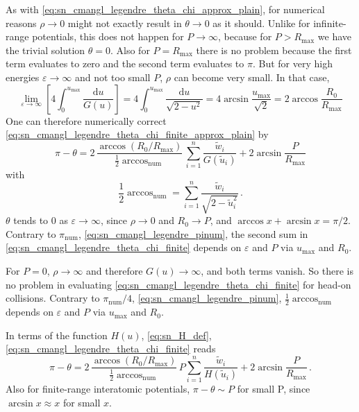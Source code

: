As with \cref{eq:sn_cmangl_legendre_theta_chi_approx_plain}, for numerical reasons $\rho \rightarrow 0$ might not exactly result in $\theta \rightarrow 0$ as it should.
Unlike for infinite-range potentials, this does not happen for $P \rightarrow \infty$, because for $P > R_\mathrm{max}$ we have the trivial solution $\theta = 0$.
Also for $P = R_\mathrm{max}$ there is no problem because the first term evaluates to zero and the second term evaluates to $\pi$.
But for very high energies $\varepsilon \rightarrow \infty$ and not too small $P$, $\rho$ can become very small.
In that case,
%
\begin{equation}
    \lim_{\varepsilon \rightarrow \infty} \left[
        4 \int_{0}^{u_\mathrm{max}} \frac{ \mathrm{d} u}{G(u)} \right] =
        4 \int_{0}^{u_\mathrm{max}} \frac{ \mathrm{d} u}{\sqrt{2-u^2}} =
        4 \arcsin \frac{u_\mathrm{max}}{\sqrt{2}} = 2 \arccos \frac{R_0}{R_\mathrm{max}}
\end{equation}
%
One can therefore numerically correct \cref{eq:sn_cmangl_legendre_theta_chi_finite_approx_plain} by
%
\begin{equation}
    \label{eq:sn_cmangl_legendre_theta_chi_finite}
    \pi - \theta =
        2 \, \frac{\arccos (R_0 / R_\mathrm{max})}{\frac{1}{2} \arccos_\mathrm{num}} \,
            \sum_{i=1}^n \frac{ \tilde{w}_i }{G( \tilde{u}_i)}
        + 2 \arcsin \frac{P}{R_\mathrm{max}}
\end{equation}
%
with
%
\begin{equation}
    \frac{1}{2} \arccos_\mathrm{num} =
        \sum_{i=1}^n \frac{ \tilde{w}_i }{\sqrt{2 - \tilde{u}_i^2}} \, .
\end{equation}
$\theta$ tends to 0 as $\varepsilon \rightarrow \infty$, since $\rho \rightarrow 0$ and $R_0 \rightarrow P$, and $\arccos x + \arcsin x = \pi/2$. Contrary to $\pi_\mathrm{num}$, \cref{eq:sn_cmangl_legendre_pinum}, the second sum in \cref{eq:sn_cmangl_legendre_theta_chi_finite} depends on $\varepsilon$ and $P$ via $u_\mathrm{max}$ and $R_0$.

For $P = 0$, $\rho \rightarrow \infty$ and therefore $G(u) \rightarrow \infty$, and both terms vanish. So there is no problem in evaluating \cref{eq:sn_cmangl_legendre_theta_chi_finite} for head-on collisions.
Contrary to $\pi_\mathrm{num}/4$, \cref{eq:sn_cmangl_legendre_pinum}, $\frac{1}{2} \arccos_\mathrm{num}$ depends on $\varepsilon$ and $P$ via $u_\mathrm{max}$ and $R_0$.

In terms of the function $H(u)$, \cref{eq:sn_H_def}, \cref{eq:sn_cmangl_legendre_theta_chi_finite} reads
%
\begin{equation}
    \label{eq:sn_cmangl_legendre_theta_H_finite}
    \pi - \theta =
        2 \, \frac{\arccos (R_0 / R_\mathrm{max})}{\frac{1}{2}\arccos_\mathrm{num}} \,
        P \sum_{i=1}^n \frac{ \tilde{w}_i }{H( \tilde{u}_i)}
        + 2 \arcsin \frac{P}{R_\mathrm{max}} \, .
\end{equation}
%
Also for finite-range interatomic potentials, $\pi - \theta \sim P$ for small P, since $\arcsin x \approx x$ for small $x$.

